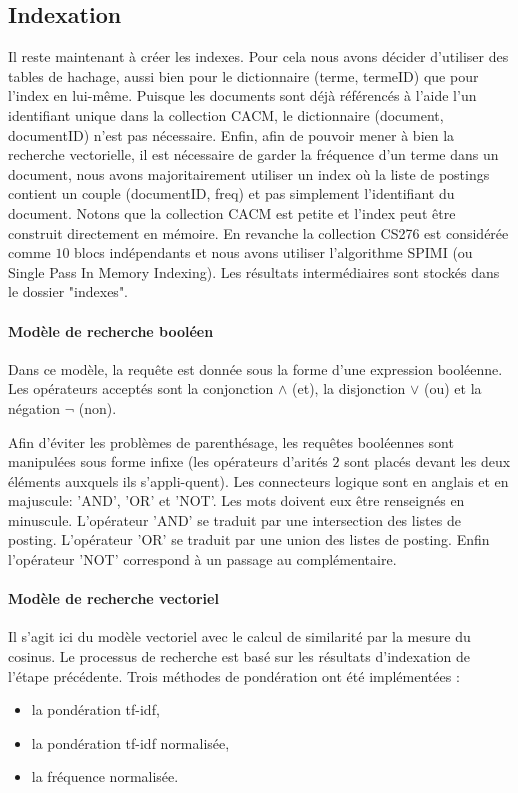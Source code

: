 \documentclass[12pt,a4paper]{article}
\begin{document}
\subsection{Indexation}
Il reste maintenant à créer les indexes. Pour cela nous avons décider d'utiliser des tables de hachage, aussi bien pour le dictionnaire (terme, termeID) que pour l'index en lui-même. Puisque les documents sont déjà référencés à l'aide l'un identifiant unique dans la collection CACM, le dictionnaire (document, documentID) n'est pas nécessaire. Enfin, afin de pouvoir mener à bien la recherche vectorielle, il est nécessaire de garder la fréquence d'un terme dans un document, nous avons majoritairement utiliser un index où la liste de postings contient un couple (documentID, freq) et pas simplement l'identifiant du document. Notons que la collection CACM est petite et l’index peut être construit directement en mémoire. En revanche la collection CS276 est considérée comme $10$ blocs indépendants et nous avons utiliser l'algorithme SPIMI (ou Single Pass In Memory Indexing). Les résultats intermédiaires sont stockés dans le dossier "indexes".

\paragraph{Modèle de recherche booléen} Dans ce modèle, la requête est donnée sous la forme d'une expression booléenne. Les opérateurs acceptés sont la conjonction $\wedge$ (et), la disjonction $\vee$ (ou) et la négation $\neg$ (non).

Afin d'éviter les problèmes de parenthésage, les requêtes booléennes sont manipulées sous forme infixe (les opérateurs d'arités $2$ sont placés devant les deux éléments auxquels ils s'appli-quent). Les connecteurs logique sont en anglais et en majuscule: 'AND', 'OR' et 'NOT'. Les mots doivent eux être renseignés en minuscule. L'opérateur 'AND' se traduit par une intersection des listes de posting. L'opérateur 'OR' se traduit par une union des listes de posting. Enfin l'opérateur 'NOT' correspond à un passage au complémentaire.

\paragraph{Modèle de recherche vectoriel} Il s'agit ici du modèle vectoriel avec le calcul de similarité par la mesure du cosinus. Le processus de recherche est basé sur les résultats d'indexation de l'étape précédente. Trois méthodes de pondération ont été implémentées :
\begin{itemize}
\item la pondération tf-idf,
\item la pondération tf-idf normalisée,
\item la fréquence normalisée.
\end{itemize}
\end{document}

